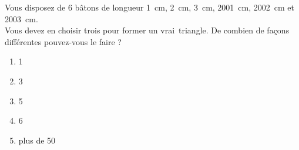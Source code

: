 Vous disposez de 6 bâtons de longueur 1~cm, 2~cm, 3~cm, 2001~cm, 2002~cm et 2003~cm.
\\Vous devez en choisir trois pour former un \og vrai\fg\ triangle. De combien de façons différentes pouvez-vous le faire ?
\begin{multicols}{5}
  \begin{enumerate}[A/]
  \item 1
  \item 3
  \item 5
  \item 6
  \item plus de 50
  \end{enumerate}
\end{multicols}